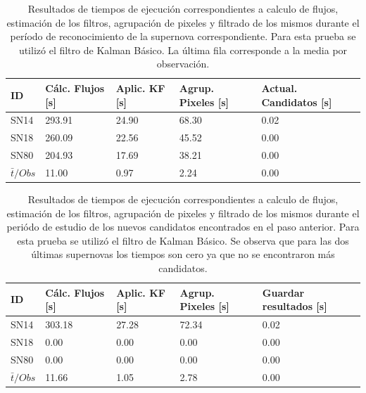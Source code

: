 \begin{table}[h!]
\centering
\caption{Resultados de tiempos de ejecuci\'on correspondientes a calculo de flujos, estimaci\'on de los filtros, agrupaci\'on de pixeles y filtrado de los mismos durante el per\'iodo de reconocimiento de la supernova correspondiente. Para esta prueba se utiliz\'o el filtro de Kalman B\'asico. La \'ultima fila corresponde a la media por observaci\'on.}
\begin{tabular}{|l|l|l|l|l|}
\hline
\textbf{ID} & \textbf{C\'alc. Flujos [s]} & \textbf{Aplic. KF [s]} &  \textbf{Agrup. Pixeles [s]}  & \textbf{Actual. Candidatos [s]}\\ \hline \hline
SN14        & 293.91            & 24.90        &  68.30 & 0.02 \\ \hline
SN18            & 260.09             & 22.56         &  45.52  & 0.00\\ \hline
SN80            & 204.93             & 17.69         &   38.21 & 0.00 \\ \hline \hline
$\bar{t}/Obs$ & 11.00 &  0.97 & 2.24 & 0.00\\\hline 
\end{tabular}
\label{tab:t1}
\end{table}

\begin{table}[h!]
\centering
\caption{Resultados de tiempos de ejecuci\'on correspondientes a calculo de flujos, estimaci\'on de los filtros, agrupaci\'on de pixeles y filtrado de los mismos durante el peri\'odo de estudio de los nuevos candidatos encontrados en el paso anterior. Para esta prueba se utiliz\'o el filtro de Kalman B\'asico. Se observa que para las dos \'ultimas supernovas los tiempos son cero ya que no se encontraron m\'as candidatos.}
\begin{tabular}{|l|l|l|l|l|}
\hline
\textbf{ID} & \textbf{C\'alc. Flujos [s]} & \textbf{Aplic. KF [s]} &  \textbf{Agrup. Pixeles [s]}  & \textbf{Guardar resultados [s]}\\ \hline \hline
SN14        & 303.18            & 27.28        &  72.34 & 0.02 \\ \hline
SN18            & 0.00             & 0.00         &  0.00  & 0.00\\ \hline
SN80            & 0.00             & 0.00         &   0.00 & 0.00 \\ \hline\hline 
$\bar{t}/Obs$ & 11.66 &  1.05 & 2.78 & 0.00\\\hline 
\end{tabular}
\label{tab:t2}
\end{table}

